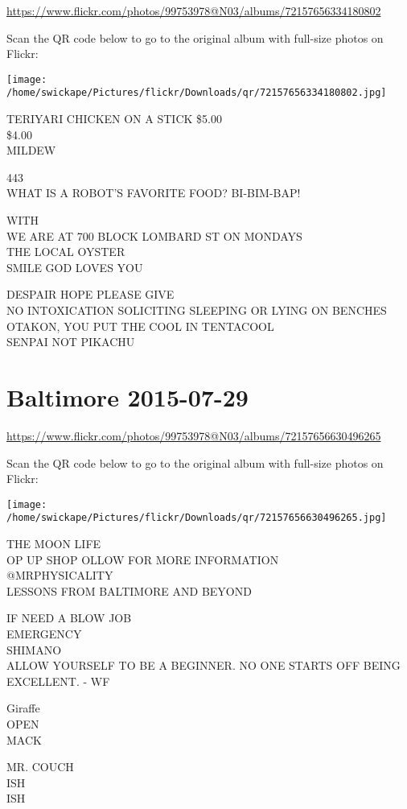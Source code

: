 \documentclass[10pt,letterpaper]{article}
\begin{document}
\url{https://www.flickr.com/photos/99753978@N03/albums/72157656334180802}

Scan the QR code below to go to the original album with full-size photos on Flickr:

\texttt{[image: /home/swickape/Pictures/flickr/Downloads/qr/72157656334180802.jpg]}


TERIYARI CHICKEN ON A STICK \$5.00\\
\$4.00\\
MILDEW

443\\
WHAT IS A ROBOT'S FAVORITE FOOD?  BI{-}BIM{-}BAP!

WITH\\
WE ARE AT 700 BLOCK LOMBARD ST ON MONDAYS\\
THE LOCAL OYSTER\\
SMILE GOD LOVES YOU

DESPAIR HOPE PLEASE GIVE\\
NO INTOXICATION SOLICITING SLEEPING OR LYING ON BENCHES\\
OTAKON, YOU PUT THE COOL IN TENTACOOL\\
SENPAI NOT PIKACHU


\section*{Baltimore 2015-07-29}

\url{https://www.flickr.com/photos/99753978@N03/albums/72157656630496265}

Scan the QR code below to go to the original album with full-size photos on Flickr:

\texttt{[image: /home/swickape/Pictures/flickr/Downloads/qr/72157656630496265.jpg]}


THE MOON LIFE\\
OP UP SHOP OLLOW FOR MORE INFORMATION\\
@MRPHYSICALITY\\
LESSONS FROM BALTIMORE AND BEYOND

IF NEED A BLOW JOB\\
EMERGENCY\\
SHIMANO\\
ALLOW YOURSELF TO BE A BEGINNER.  NO ONE STARTS OFF BEING EXCELLENT.  {-} WF

Giraffe\\
OPEN\\
MACK

MR. COUCH\\
ISH\\
ISH
\end{document}
